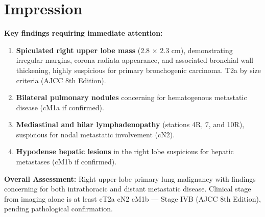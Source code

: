 \section{Impression}

\begin{alertbox}
\textbf{Key findings requiring immediate attention:}
\end{alertbox}

\vspace{6pt}

\begin{enumerate}[leftmargin=*, itemsep=6pt, topsep=4pt]
  \item \textbf{Spiculated right upper lobe mass} (2.8 $\times$ 2.3 cm), demonstrating irregular margins, corona radiata appearance, and associated bronchial wall thickening, highly suspicious for primary bronchogenic carcinoma. T2a by size criteria (AJCC 8th Edition).
  \item \textbf{Bilateral pulmonary nodules} concerning for hematogenous metastatic disease (cM1a if confirmed).
  \item \textbf{Mediastinal and hilar lymphadenopathy} (stations 4R, 7, and 10R), suspicious for nodal metastatic involvement (cN2).
  \item \textbf{Hypodense hepatic lesions} in the right lobe suspicious for hepatic metastases (cM1b if confirmed).
\end{enumerate}

\vspace{6pt}

\textbf{Overall Assessment:} Right upper lobe primary lung malignancy with findings concerning for both intrathoracic and distant metastatic disease. Clinical stage from imaging alone is at least cT2a cN2 cM1b --- Stage IVB (AJCC 8th Edition), pending pathological confirmation.
